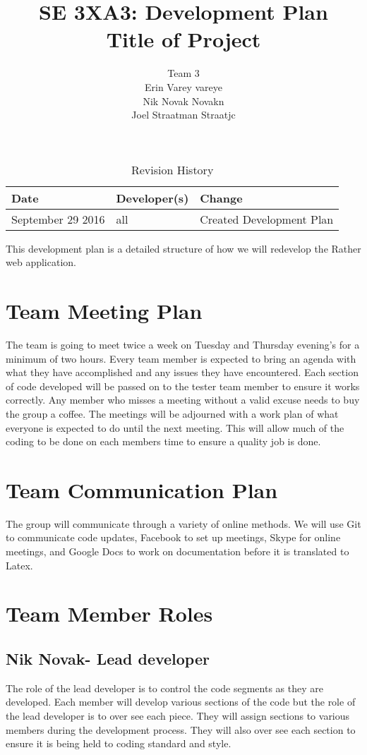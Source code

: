 \documentclass{article}
\title{SE 3XA3: Development Plan\\Title of Project}
\author{Team 3
		\\ Erin Varey vareye
		\\ Nik Novak Novakn
		\\ Joel Straatman Straatjc
}
\date{}
\begin{document}
\begin{table}[hp]
\caption{Revision History} \label{TblRevisionHistory}
\begin{tabularx}{\textwidth}{llX}
\toprule
\textbf{Date} & \textbf{Developer(s)} & \textbf{Change}\\
\midrule
September 29 2016 & all & Created Development Plan\\

\bottomrule
\end{tabularx}
\end{table}
\newpage
\maketitle
This development plan is a detailed structure of how we will redevelop the Rather web application.
\section{Team Meeting Plan}
The team is going to meet twice a week on Tuesday and Thursday evening's for a minimum of two hours. Every team member is expected to bring an agenda with what they have accomplished and any issues they have encountered. Each section of code developed will be passed on to the tester team member to ensure it works correctly. Any member who misses a meeting without a valid excuse needs to buy the group a coffee. The meetings will be adjourned with a work plan of what everyone is expected to do until the next meeting. This will allow much of the coding to be done on each members time to ensure a quality job is done. 
\section{Team Communication Plan}
The group will communicate through a variety of online methods. We will use Git to communicate code updates, Facebook to set up meetings, Skype for online meetings, and Google Docs to work on documentation before it is translated to Latex.
\section{Team Member Roles}
\subsection{Nik Novak- Lead developer}
The role of the lead developer is to control the code segments as they are developed. Each member will develop various sections of the code but the role of the lead developer is to over see each piece. They will assign sections to various members during the development process. They will also over see each section to ensure it is being held to coding standard and style. 
\end{document}
